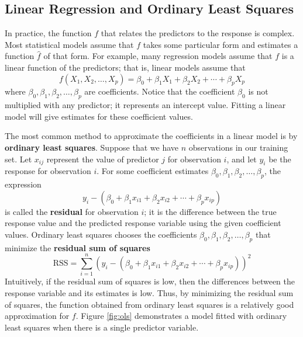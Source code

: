 \documentclass{article}
\begin{document}
\subsection{Linear Regression and Ordinary Least Squares}

In practice, the function $f$ that relates the predictors to the response is complex. Most statistical models assume that $f$ takes some particular form and estimates a function $\hat{f}$ of that form. For example, many regression models assume that $f$ is a linear function of the predictors; that is, linear models assume that
\begin{equation}\label{eqn:linear-model}
	f(X_1, X_2, \dotsc, X_p) = \beta_0 + \beta_1 X_1 + \beta_2 X_2 + \cdots + \beta_p X_p
\end{equation}
where $\beta_0, \beta_1, \beta_2, \dotsc, \beta_p$ are coefficients. Notice that the coefficient $\beta_0$ is not multiplied with any predictor; it represents an intercept value. Fitting a linear model will give estimates for these coefficient values.

The most common method to approximate the coefficients in a linear model is by \textbf{ordinary least squares}. Suppose that we have $n$ observations in our training set. Let $x_{ij}$ represent the value of predictor $j$ for observation $i$, and let $y_i$ be the response for observation $i$. For some coefficient estimates $\beta_0, \beta_1, \beta_2, \dotsc, \beta_p$, the expression
\begin{equation}
	y_i - (\beta_0 + \beta_1 x_{i1} + \beta_2 x_{i2} + \cdots + \beta_p x_{ip})
\end{equation}
is called the \textbf{residual} for observation $i$; it is the difference between the true response value and the predicted response variable using the given coefficient values. Ordinary least squares chooses the coefficients $\beta_0, \beta_1, \beta_2, \dotsc, \beta_p$ that minimize the \textbf{residual sum of squares}
\begin{equation}\label{eqn:RSS}
	\text{RSS} = \sum\limits_{i = 1}^n (y_i - (\beta_0 + \beta_1 x_{i1} + \beta_2 x_{i2} + \cdots + \beta_p x_{ip}))^2
\end{equation}
Intuitively, if the residual sum of squares is low, then the differences between the response variable and its estimates is low. Thus, by minimizing the residual sum of squares, the function obtained from ordinary least squares is a relatively good approximation for $f$. Figure \ref{fig:ols} demonstrates a model fitted with ordinary least squares when there is a single predictor variable.
\end{document}
